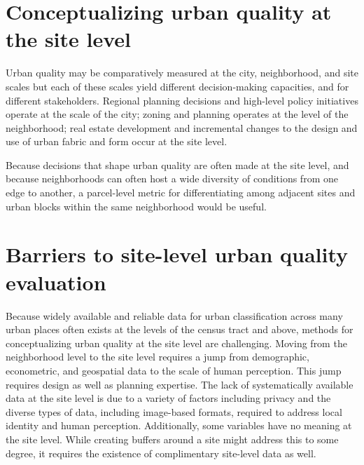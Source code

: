 \documentclass[
]{book}
\begin{document}
\hypertarget{conceptualizing-urban-quality-at-the-site-level}{%
\section{Conceptualizing urban quality at the site level}\label{conceptualizing-urban-quality-at-the-site-level}}

Urban quality may be comparatively measured at the city, neighborhood, and site scales but each of these scales yield different decision-making capacities, and for different stakeholders. Regional planning decisions and high-level policy initiatives operate at the scale of the city; zoning and planning operates at the level of the neighborhood; real estate development and incremental changes to the design and use of urban fabric and form occur at the site level.

Because decisions that shape urban quality are often made at the site level, and because neighborhoods can often host a wide diversity of conditions from one edge to another, a parcel-level metric for differentiating among adjacent sites and urban blocks within the same neighborhood would be useful.

\hypertarget{barriers-to-site-level-urban-quality-evaluation}{%
\section{Barriers to site-level urban quality evaluation}\label{barriers-to-site-level-urban-quality-evaluation}}

Because widely available and reliable data for urban classification across many urban places often exists at the levels of the census tract and above, methods for conceptualizing urban quality at the site level are challenging. Moving from the neighborhood level to the site level requires a jump from demographic, econometric, and geospatial data to the scale of human perception. This jump requires design as well as planning expertise. The lack of systematically available data at the site level is due to a variety of factors including privacy and the diverse types of data, including image-based formats, required to address local identity and human perception. Additionally, some variables have no meaning at the site level. While creating buffers around a site might address this to some degree, it requires the existence of complimentary site-level data as well.
\end{document}
